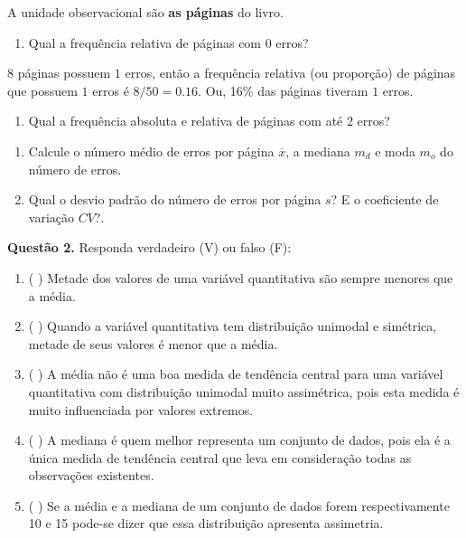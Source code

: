 \documentclass[
]{article}
\providecommand{\tightlist}{%
  \setlength{\itemsep}{0pt}\setlength{\parskip}{0pt}}
\begin{document}
A unidade observacional são \textbf{as páginas} do livro.

\begin{enumerate}
\def\labelenumi{\alph{enumi}.}
\setcounter{enumi}{1}
\tightlist
\item
  Qual a frequência relativa de páginas com 0 erros?
\end{enumerate}

8 páginas possuem \(1\) erros, então a frequência relativa (ou
proporção) de páginas que possuem \(1\) erros é \(8/ 50= 0.16\). Ou,
16\% das páginas tiveram \(1\) erros.

\begin{enumerate}
\def\labelenumi{\alph{enumi}.}
\setcounter{enumi}{2}
\tightlist
\item
  Qual a frequência absoluta e relativa de páginas com até 2 erros?
\end{enumerate}

\begin{enumerate}
\def\labelenumi{\alph{enumi}.}
\setcounter{enumi}{3}
\item
  Calcule o número médio de erros por página \(\overline x\), a mediana
  \(m_d\) e moda \(m_o\) do número de erros.
\item
  Qual o desvio padrão do número de erros por página \(s\)? E o
  coeficiente de variação \(CV\)?.
\end{enumerate}

\vspace{1.0cm}

\textbf{Questão 2.} Responda verdadeiro (V) ou falso (F):

\begin{enumerate}
\def\labelenumi{\alph{enumi}.}
\item
  ( \hspace{0,5cm} ) Metade dos valores de uma variável quantitativa são
  sempre menores que a média.
\item
  ( \hspace{0,5cm} ) Quando a variável quantitativa tem distribuição
  unimodal e simétrica, metade de seus valores é menor que a média.
\item
  ( \hspace{0,5cm} ) A média não é uma boa medida de tendência central
  para uma variável quantitativa com distribuição unimodal muito
  assimétrica, pois esta medida é muito influenciada por valores
  extremos.
\item
  ( \hspace{0,5cm} ) A mediana é quem melhor representa um conjunto de
  dados, pois ela é a única medida de tendência central que leva em
  consideração todas as observações existentes.
\item
  ( \hspace{0,5cm} ) Se a média e a mediana de um conjunto de dados
  forem respectivamente 10 e 15 pode-se dizer que essa distribuição
  apresenta assimetria.
\end{enumerate}
\end{document}
